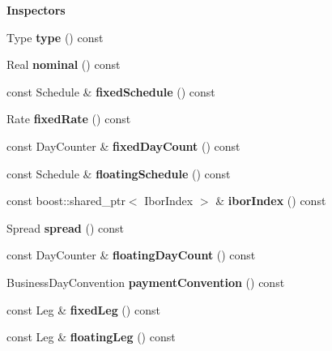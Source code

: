 \begin{Indent}{\bf Inspectors}\par
\begin{DoxyCompactItemize}
\item 
Type {\bfseries type} () const \label{class_quant_lib_1_1_vanilla_swap_a132e49d9b3b87ebc42b969492e1efb5d}

\item 
Real {\bfseries nominal} () const \label{class_quant_lib_1_1_vanilla_swap_a8765b8fd0f39a46cd4c6901318fd733e}

\item 
const Schedule \& {\bfseries fixed\+Schedule} () const \label{class_quant_lib_1_1_vanilla_swap_a4c0354f9bdf627ab550f268544d3eb4a}

\item 
Rate {\bfseries fixed\+Rate} () const \label{class_quant_lib_1_1_vanilla_swap_ada1040f60092219d46308c7600e976b8}

\item 
const Day\+Counter \& {\bfseries fixed\+Day\+Count} () const \label{class_quant_lib_1_1_vanilla_swap_a2cab4d357fa9882e3094089e0e08a8ee}

\item 
const Schedule \& {\bfseries floating\+Schedule} () const \label{class_quant_lib_1_1_vanilla_swap_a881f19d4618dfbe091e247e76be07a77}

\item 
const boost\+::shared\+\_\+ptr$<$ Ibor\+Index $>$ \& {\bfseries ibor\+Index} () const \label{class_quant_lib_1_1_vanilla_swap_a2932e801289bef9dca6bdfea725c0db2}

\item 
Spread {\bfseries spread} () const \label{class_quant_lib_1_1_vanilla_swap_ab69a03991929c479b3f7230ee0a30454}

\item 
const Day\+Counter \& {\bfseries floating\+Day\+Count} () const \label{class_quant_lib_1_1_vanilla_swap_ab1d63295873c463f8f73ef9ed2a4fbbf}

\item 
Business\+Day\+Convention {\bfseries payment\+Convention} () const \label{class_quant_lib_1_1_vanilla_swap_a1f89e497754da98b81f566c4ca65966a}

\item 
const Leg \& {\bfseries fixed\+Leg} () const \label{class_quant_lib_1_1_vanilla_swap_ab36b1784d126acbdce93607e39b6d5f0}

\item 
const Leg \& {\bfseries floating\+Leg} () const \label{class_quant_lib_1_1_vanilla_swap_a0e0ddfc22918ae66ee6a6230902feca9}

\end{DoxyCompactItemize}
\end{Indent}
